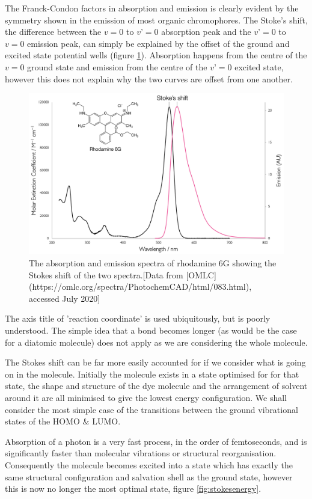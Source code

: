 \documentclass[
]{book}
\begin{document}
The Franck-Condon factors in absorption and emission is clearly evident by the symmetry shown in the emission of most organic chromophores. The Stoke's shift, the difference between the \(v=0\) to \(v’=0\) absorption peak and the \(v’=0\) to \(v=0\) emission peak, can simply be explained by the offset of the ground and excited state potential wells (figure \ref{fig:stokesspectrum}). Absorption happens from the centre of the \(v=0\) ground state and emission from the centre of the \(v’=0\) excited state, however this does not explain why the two curves are offset from one another.

\begin{figure}

{\centering \includegraphics[width=0.7\linewidth]{images/stokesspectrum} 

}

\caption{The absorption and emission spectra of rhodamine 6G showing the Stokes shift of the two spectra.[Data from [OMLC](https://omlc.org/spectra/PhotochemCAD/html/083.html), accessed July 2020]}\label{fig:stokesspectrum}
\end{figure}

The axis title of 'reaction coordinate' is used ubiquitously, but is poorly understood. The simple idea that a bond becomes longer (as would be the case for a diatomic molecule) does not apply as we are considering the whole molecule.

The Stokes shift can be far more easily accounted for if we consider what is going on in the molecule. Initially the molecule exists in a state optimised for for that state, the shape and structure of the dye molecule and the arrangement of solvent around it are all minimised to give the lowest energy configuration. We shall consider the most simple case of the transitions between the ground vibrational states of the HOMO \& LUMO.

Absorption of a photon is a very fast process, in the order of femtoseconds, and is significantly faster than molecular vibrations or structural reorganisation. Consequently the molecule becomes excited into a state which has exactly the same structural configuration and salvation shell as the ground state, however this is now no longer the most optimal state, figure \ref{fig:stokesenergy}.
\end{document}
